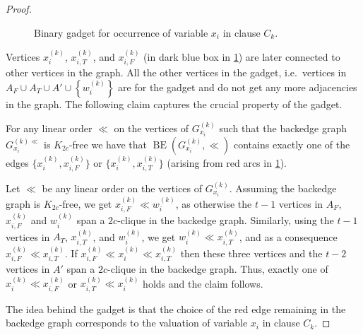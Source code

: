 \documentclass[a4paper,USenglish,cleveref,autoref,thm-restate,pdfa]{lipics-v2021}
\newcommand{\set}[1]{\left\{#1\right\}}
\DeclareMathOperator{\backedge}{BE}
\let\emph\relax\DeclareTextFontCommand{\emph}{\color{dark blue}\em}
\begin{document}
\begin{proof}
\begin{figure}
\begin{center}
\begin{tiny}
\end{tiny}
\end{center}
    \caption{\label{fig:binary_gadget} Binary gadget for occurrence of variable $x_i$ in clause $C_k$.
}
\end{figure}
    Vertices $x_i^{(k)}$, $x_{i,T}^{(k)}$, and $x_{i,F}^{(k)}$ (in dark blue box in \cref{fig:binary_gadget}) are later connected to other vertices in the graph.
    All the other vertices in the gadget, i.e.\ vertices in $A_F\cup A_T \cup A' \cup \set{w_i^{(k)}}$ are \emph{internal} for the gadget and do not get any more adjacencies in the graph.
    The following claim captures the crucial property of the gadget.
    \begin{claim}\label{clm:binary_gadget}
      For any linear order $\ll$ on the vertices of $G_{x_i}^{(k)}$ such that the backedge graph $G_{x_i}^{(k)\ll}$ is $K_{2c}$-free we have
    that $\backedge(G_{x_i}^{(k)},\ll)$ contains exactly one of the edges $\{x_i^{(k)},x_{i,F}^{(k)}\}$ or $\{x_i^{(k)},x_{i,T}^{(k)}\}$ (arising from red arcs in \cref{fig:binary_gadget}).
\end{claim}
    \begin{claimproof}
        Let $\ll$ be any linear order on the vertices of $G_{x_i}^{(k)}$.
        Assuming the backedge graph is $K_{2c}$-free, we get $x_{i,F}^{(k)} \ll w_i^{(k)}$, as otherwise the $t-1$ vertices in $A_F$, $x_{i,F}^{(k)}$ and $w_{i}^{(k)}$ span a $2c$-clique in the backedge graph.
        Similarly, using the $t-1$ vertices in $A_T$, $x_{i,T}^{(k)}$, and $w_i^{(k)}$, we get $w_i^{(k)} \ll x_{i,T}^{(k)}$, and as a consequence $x_{i,F}^{(k)} \ll x_{i,T}^{(k)}$.
        If $x_{i,F}^{(k)} \ll x_i^{(k)} \ll x_{i,T}^{(k)}$ then these three vertices and the $t-2$ vertices in $A'$ span a $2c$-clique in the backedge graph.
        Thus, exactly one of $x_i^{(k)} \ll x_{i,F}^{(k)}$ or $x_{i,T}^{(k)} \ll x_i^{(k)}$ holds and the claim follows.
    \end{claimproof}

    The idea behind the gadget is that the choice of the red edge remaining in the backedge graph corresponds to the valuation of variable $x_i$ in clause $C_k$.


\end{proof}
\end{document}
